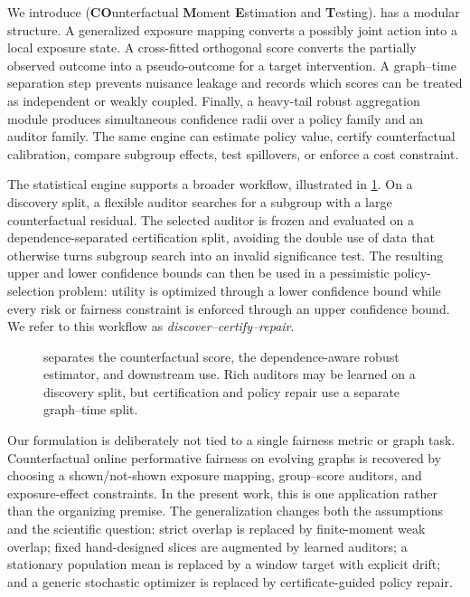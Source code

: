 We introduce \textbf{\COMET} (\textbf{CO}unterfactual \textbf{M}oment \textbf{E}stimation and \textbf{T}esting). \COMET has a modular structure. A generalized exposure mapping converts a possibly joint action into a local exposure state. A cross-fitted orthogonal score converts the partially observed outcome into a pseudo-outcome for a target intervention. A graph--time separation step prevents nuisance leakage and records which scores can be treated as independent or weakly coupled. Finally, a heavy-tail robust aggregation module produces simultaneous confidence radii over a policy family and an auditor family. The same engine can estimate policy value, certify counterfactual calibration, compare subgroup effects, test spillovers, or enforce a cost constraint.

The statistical engine supports a broader workflow, illustrated in \cref{fig:overview}. On a discovery split, a flexible auditor searches for a subgroup with a large counterfactual residual. The selected auditor is frozen and evaluated on a dependence-separated certification split, avoiding the double use of data that otherwise turns subgroup search into an invalid significance test. The resulting upper and lower confidence bounds can then be used in a pessimistic policy-selection problem: utility is optimized through a lower confidence bound while every risk or fairness constraint is enforced through an upper confidence bound. We refer to this workflow as \emph{discover--certify--repair}.

\begin{figure}[t]
  \centering
  \resizebox{\linewidth}{!}{}
  \caption{\COMET separates the counterfactual score, the dependence-aware robust estimator, and downstream use. Rich auditors may be learned on a discovery split, but certification and policy repair use a separate graph--time split.}
  \label{fig:overview}
\end{figure}

Our formulation is deliberately not tied to a single fairness metric or graph task. Counterfactual online performative fairness on evolving graphs \citep{li2026copf} is recovered by choosing a shown/not-shown exposure mapping, group--score auditors, and exposure-effect constraints. In the present work, this is one application rather than the organizing premise. The generalization changes both the assumptions and the scientific question: strict overlap is replaced by finite-moment weak overlap; fixed hand-designed slices are augmented by learned auditors; a stationary population mean is replaced by a window target with explicit drift; and a generic stochastic optimizer is replaced by certificate-guided policy repair.

